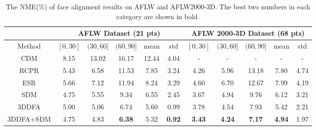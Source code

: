 \documentclass[10pt,twocolumn,letterpaper]{article}
\begin{document}
\begin{table*}[t!]
\centering
\caption{The NME(\%) of face alignment results on AFLW and AFLW2000-3D. The best two numbers in each category are shown in bold.}
\label{tab:exp_results}
\begin{tabular}{|c||c|c|c|c|c||c|c|c|c|c|}
\hline
 & \multicolumn{5}{c||}{AFLW Dataset (21 pts)} & \multicolumn{5}{c|}{AFLW 2000-3D Dataset (68 pts)} \\ \hline
Method & $[0, 30]$ & $(30, 60]$ & $(60, 90]$ & mean & std & $[0, 30]$ & $(30, 60]$ & $(60, 90]$ & mean & std \\ \hline
CDM & 8.15 & 13.02 & 16.17 & 12.44 & 4.04 & - & - & - & - & - \\ \hline
RCPR & 5.43 & 6.58 & 11.53 & 7.85 & 3.24 & 4.26 & 5.96 & 13.18 & 7.80 & 4.74\\ \hline
ESR & 5.66 & 7.12 & 11.94 & 8.24 & 3.29 & 4.60 & 6.70 & 12.67 & 7.99 & 4.19 \\ \hline
SDM & 4.75 & 5.55 & 9.34 & 6.55 & 2.45 & 3.67 & 4.94 & 9.76 & 6.12 & 3.21 \\ \hline
3DDFA & 5.00 & 5.06 & 6.74 & 5.60 & 0.99 & 3.78 & 4.54 & 7.93 & 5.42 & 2.21 \\ \hline
3DDFA+SDM & 4.75 & 4.83 & \textbf{6.38} & 5.32 & \textbf{0.92} & \textbf{3.43} & \textbf{4.24} & \textbf{7.17} & \textbf{4.94} & 1.97 \\

\end{tabular}
\end{table*}
\end{document}
